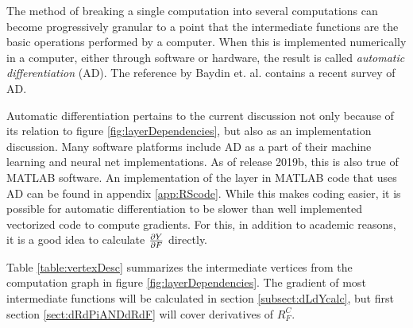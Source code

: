 The method of breaking a single computation into several computations can become progressively granular to a point that the intermediate functions are the basic operations performed by a computer. When this is implemented numerically in a computer, either through software or hardware, the result is called \textit{automatic differentiation} (AD).  The reference by Baydin et. al. \cite{baydin2017automatic} contains a recent survey of AD.  

Automatic differentiation pertains to the current discussion not only because of its relation to figure \ref{fig:layerDependencies}, but also as an implementation discussion. Many software platforms include AD as a part of their machine learning and neural net implementations. As of release 2019b, this is also true of MATLAB software.  An implementation of the \RS layer in MATLAB code  that uses AD can be found in appendix \ref{app:RScode}.  While this makes coding easier, it is possible for automatic differentiation to be slower than well implemented vectorized code to compute gradients.  For this, in addition to academic reasons, it is a good idea to calculate \( \pdv{Y}{F} \) directly.

Table \ref{table:vertexDesc} summarizes the intermediate vertices from the computation graph in figure \ref{fig:layerDependencies}.  The gradient of most intermediate functions will be calculated in section \ref{subsect:dLdYcalc}, but first section \ref{sect:dRdPiANDdRdF} will cover derivatives of \( R_F^C \).

